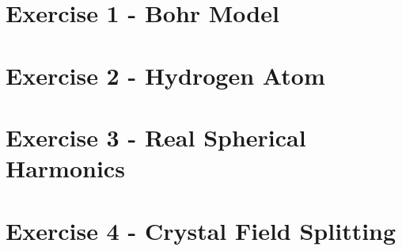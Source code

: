 








\section{Exercise 1 - Bohr Model}


\section{Exercise 2 - Hydrogen Atom}


\section{Exercise 3 - Real Spherical Harmonics}


\section{Exercise 4 - Crystal Field Splitting}



